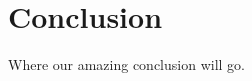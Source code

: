\documentclass[10pt,journal,compsoc]{IEEEtran}
\begin{document}
%






\section{Conclusion}
Where our amazing conclusion will go.

\newpage
\end{document}
